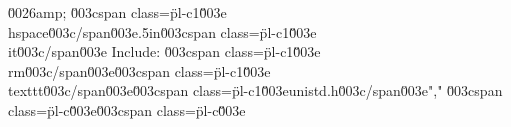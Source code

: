 \u0026amp; \u003cspan class=\"pl-c1\"\u003e\\hspace\u003c/span\u003e{.5in}\u003cspan class=\"pl-c1\"\u003e\\it\u003c/span\u003e Include: \u003cspan class=\"pl-c1\"\u003e\\rm\u003c/span\u003e\u003cspan class=\"pl-c1\"\u003e\\texttt\u003c/span\u003e{\u003cspan class=\"pl-c1\"\u003eunistd.h\u003c/span\u003e}","    \u003cspan class=\"pl-c\"\u003e\u003cspan class=\"pl-c\"\u003e%